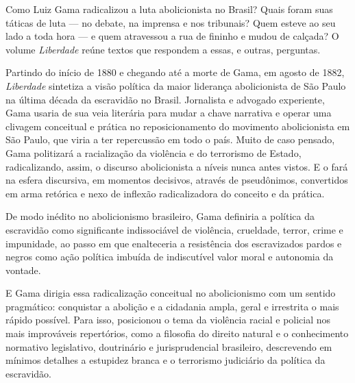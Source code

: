 \begin{multicols}{2}
\noindent{}Como Luiz Gama radicalizou a luta abolicionista no Brasil? Quais foram suas táticas de luta --- no debate, na imprensa e nos tribunais? Quem esteve ao seu lado a toda 
hora --- e quem atravessou a rua de fininho e mudou de calçada?
O volume \textit{Liberdade} reúne textos que respondem a essas, e outras, perguntas.

Partindo do início de 1880 e chegando até a morte de Gama, em agosto de 1882, \textit{Liberdade} sintetiza a visão política da maior liderança abolicionista de São Paulo na última década da escravidão no Brasil. Jornalista e advogado experiente, Gama usaria de sua veia literária para mudar a chave narrativa e operar uma clivagem conceitual e prática no reposicionamento do movimento abolicionista em São Paulo, que viria a ter repercussão em todo o país. Muito de caso pensado, Gama politizará a racialização da violência e do terrorismo de Estado, radicalizando, assim, o discurso abolicionista a níveis nunca antes vistos. E o fará na esfera discursiva, em momentos decisivos, através de pseudônimos, convertidos em arma retórica e nexo de inflexão radicalizadora do conceito e da prática.

De modo inédito no abolicionismo brasileiro, Gama definiria a política da escravidão como significante indissociável de violência, crueldade, terror, crime e impunidade, ao passo em que enalteceria a resistência dos escravizados pardos e negros como ação política imbuída de indiscutível valor moral e autonomia da vontade.

\vspace{\baselineskip}
{\small{}}
\vspace{\baselineskip}

E Gama dirigia essa radicalização conceitual no abolicionismo com um sentido pragmático: conquistar a abolição e a cidadania ampla, geral e irrestrita o mais rápido possível. Para isso, posicionou o tema da violência racial e policial nos mais improváveis repertórios, como a filosofia do direito natural e o conhecimento normativo legislativo, doutrinário e jurisprudencial brasileiro, descrevendo em mínimos detalhes a estupidez branca e o terrorismo judiciário da política da escravidão.


\end{multicols}
